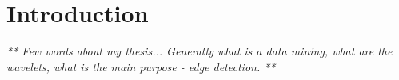 \chapter*{Introduction}

\textit{ ** Few words about my thesis...
Generally what is a data mining, what are the wavelets, what is the main purpose - edge detection. **}